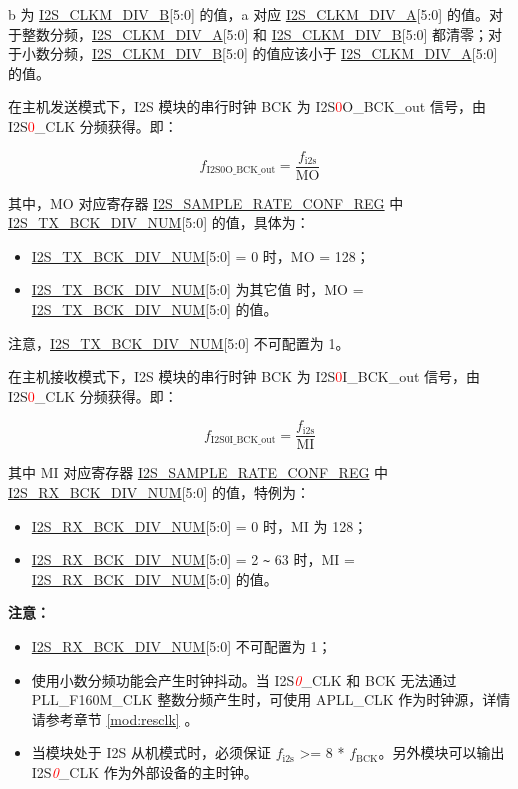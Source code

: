 \documentclass[main\_\_CN.tex]{subfiles}
\begin{document}
b 为 \hyperref[fielddesc:I2SCLKMDIVB]{I2S\_CLKM\_DIV\_B}[5:0] 的值，a 对应 \hyperref[fielddesc:I2SCLKMDIVA]{I2S\_CLKM\_DIV\_A}[5:0] 的值。对于整数分频，\hyperref[fielddesc:I2SCLKMDIVA]{I2S\_CLKM\_DIV\_A}[5:0] 和 \hyperref[fielddesc:I2SCLKMDIVB]{I2S\_CLKM\_DIV\_B}[5:0] 都清零；对于小数分频，\hyperref[fielddesc:I2SCLKMDIVB]{I2S\_CLKM\_DIV\_B}[5:0] 的值应该小于 \hyperref[fielddesc:I2SCLKMDIVA]{I2S\_CLKM\_DIV\_A}[5:0] 的值。


在主机发送模式下，I2S 模块的串行时钟 BCK 为 I2S\textcolor{red}{0}O\_BCK\_out 信号，由 I2S\textcolor{red}{0}\_CLK 分频获得。即：

$$f_{\textrm{I2S0O\_BCK\_out}} = \frac{f_{\textrm{i2s}}}{\textrm{MO}}$$


其中，MO 对应寄存器 \hyperref[regdesc:I2SSAMPLERATECONFREG]{I2S\_SAMPLE\_RATE\_CONF\_REG} 中 \hyperref[fielddesc:I2STXBCKDIVNUM]{I2S\_TX\_BCK\_DIV\_NUM}[5:0] 的值，具体为：

\begin{itemize}
    \item \hyperref[fielddesc:I2STXBCKDIVNUM]{I2S\_TX\_BCK\_DIV\_NUM}[5:0] = 0 时，MO = 128；
    \item \hyperref[fielddesc:I2STXBCKDIVNUM]{I2S\_TX\_BCK\_DIV\_NUM}[5:0] 为其它值 时，MO = \hyperref[fielddesc:I2STXBCKDIVNUM]{I2S\_TX\_BCK\_DIV\_NUM}[5:0] 的值。
\end{itemize}
注意，\hyperref[fielddesc:I2STXBCKDIVNUM]{I2S\_TX\_BCK\_DIV\_NUM}[5:0] 不可配置为 1。

在主机接收模式下，I2S 模块的串行时钟 BCK 为 I2S\textcolor{red}{0}I\_BCK\_out 信号，由 I2S\textcolor{red}{0}\_CLK 分频获得。即：

$$f_{\textrm{I2S0I\_BCK\_out}} = \frac{f_{\textrm{i2s}}}{\textrm{MI}}$$

其中 MI 对应寄存器 \hyperref[regdesc:I2SSAMPLERATECONFREG]{I2S\_SAMPLE\_RATE\_CONF\_REG} 中 \hyperref[fielddesc:I2SRXBCKDIVNUM]{I2S\_RX\_BCK\_DIV\_NUM}[5:0] 的值，特例为：

\begin{itemize}
    \item \hyperref[fielddesc:I2SRXBCKDIVNUM]{I2S\_RX\_BCK\_DIV\_NUM}[5:0] = 0 时，MI 为 128；
    \item \hyperref[fielddesc:I2SRXBCKDIVNUM]{I2S\_RX\_BCK\_DIV\_NUM}[5:0] = 2 \verb+~+ 63 时，MI = \hyperref[fielddesc:I2SRXBCKDIVNUM]{I2S\_RX\_BCK\_DIV\_NUM}[5:0] 的值。
\end{itemize}

{\bfseries 注意：}
\begin{itemize}
    \item \hyperref[fielddesc:I2SRXBCKDIVNUM]{I2S\_RX\_BCK\_DIV\_NUM}[5:0] 不可配置为 1；
    \item 使用小数分频功能会产生时钟抖动。当 I2S\textcolor{red}{\it{0}}\_CLK 和 BCK 无法通过 PLL\_F160M\_CLK 整数分频产生时，可使用 APLL\_CLK 作为时钟源，详情请参考章节 \ref{mod:resclk} \textit{}。
    \item 当模块处于 I2S 从机模式时，必须保证 $f_{\textrm{i2s}}$ >= 8 * $f_{\textrm{BCK}}$。另外模块可以输出 I2S\textcolor{red}{\it{0}}\_CLK 作为外部设备的主时钟。

\end{itemize}
\end{document}
